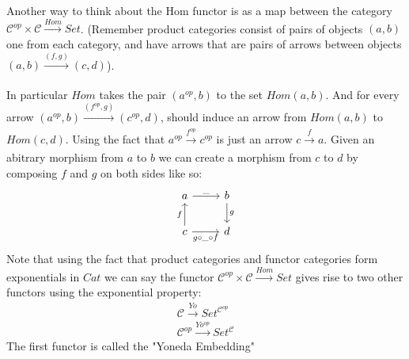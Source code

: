 \begin{definition}
    Another way to think about the Hom functor is as a map between the category $\mathcal{C}^{op} \times  \mathcal{C} \xrightarrow{Hom} Set$. (Remember product categories consist of pairs of objects $(a,b)$ one from each category, and have arrows that are pairs of arrows between objects $(a,b) \xrightarrow[]{(f,g)} (c,d)$).  

    In particular $Hom$ takes the pair $(a^{op},b)$ to the set $Hom(a,b)$. And for every arrow $(a^{op},b) \xrightarrow[]{(f^{op},g)} (c^{op},d)$, should induce an arrow from $Hom(a,b)$ to $Hom(c,d)$.  Using the fact that $a^{op} \xrightarrow[]{f^{op}} c^{op}$ is just an arrow $c \xrightarrow[]{f} a$. Given an abitrary morphism from $a$ to $b$ we can create a morphism from $c$ to $d$ by composing $f$ and $g$ on both sides like so:
\[\begin{tikzcd}
	a & b \\
	c & d
	\arrow["{\_}", from=1-1, to=1-2]
	\arrow["{g \circ \_ \circ f}"', from=2-1, to=2-2]
	\arrow["f", from=2-1, to=1-1]
	\arrow["g", from=1-2, to=2-2]
\end{tikzcd}\]
    Note that using the fact that product categories and functor categories form exponentials in $Cat$ we can say the functor $\mathcal{C}^{op} \times  \mathcal{C} \xrightarrow{Hom} Set$ gives rise to two other functors using the exponential property:
    \begin{gather*}
        \mathcal{C} \xrightarrow{Yo} Set^{\mathcal{C}^{op}}\\
        \mathcal{C}^{op} \xrightarrow{Yo^{op}} Set^{\mathcal{C}}
    \end{gather*}
    The first functor is called the "Yoneda Embedding"
\end{definition}

